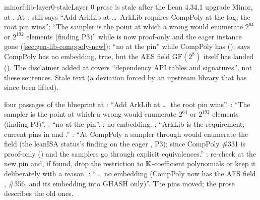 \begin{finding}{minor}{f:lib-layer0-stale}{Layer 0 prose is stale after the Lean 4.34.1 upgrade}
\textsf{Minor, at .}
 At :  still says \enquote{Add
ArkLib at  \dots\ ArkLib requires CompPoly at the  tag; the root pin
 wins};  \enquote{The sampler is the point at which a wrong
 would enumerate $2^{64}$ or $2^{192}$ elements (finding P3)} while 
is now proof-only and the eager instance gone (\cref{sec:gen-lib-comppoly-new}); 
\enquote{no  at the pin} while CompPoly  has
 (\allowbreak{});  says CompPoly has no
 embedding, true, but the AES field $\mathrm{GF}(2^8)$ itself has landed
(\allowbreak{}\allowbreak{}\allowbreak{}). The disclaimer added at  covers
\enquote{dependency API tables and signatures}, not these sentences.
 Stale text (a deviation forced by an upstream library that has since been
lifted).
\begin{change}{four passages of the blueprint at }
\asis {}: \enquote{Add ArkLib at  \dots\ the root pin 
wins}. : \enquote{The sampler is the point at which a wrong  would
enumerate $2^{64}$ or $2^{192}$ elements (finding P3)}. : \enquote{no 
at the pin}. : no  embedding.
\asproposed {}: \enquote{ArkLib is the  requirement; current pins in
 and \allowbreak{}.} : \enquote{At CompPoly
 a sampler through  would enumerate the field (the leanISA status's finding on the eager
, P3); since CompPoly \#331  is proof-only () and the samplers go
through explicit equivalences.} : re-check  at the new pin and, if
found, drop the restriction to $\mathbb{K}$-coefficient polynomials or keep it deliberately with a reason.
: \enquote{\dots\ no embedding  (CompPoly now has the AES field
, \#356, and its embedding into GHASH only)}.
\reason The pins moved; the prose describes the old ones.
\end{change}
\end{finding}

